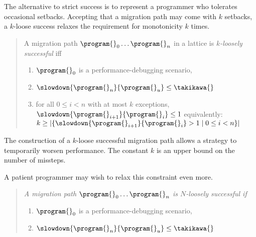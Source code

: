 The alternative to strict success is to represent a programmer who tolerates
occasional setbacks. Accepting that a migration path may come with $k$ setbacks,
a $k$-loose success relaxes the requirement for monotonicity $k$ times.

\begin{quote} \em

A migration path ${\program{}_0} \ldots {\program{}_n}$ in a
lattice  is \emph{$k$-loosely successful}
iff 
\begin{enumerate}
  \item  $\program{}_0$ is a performance-debugging scenario,
  \item $\slowdown{\program{}_n}{\program{}_u} \leq \takikawa{}$  
  \item
      for all $0 \leq i < n$ with at most $k$ exceptions,
      $\slowdown{\program{}_{i+1}}{\program{}_{i}} \leq 1$
      \subitem equivalently: $k \geq |\{ \slowdown{\program{}_{i+1}}{\program{}_{i}} > 1 \mid 0 \leq i < n\}|$
  \end{enumerate} 
\end{quote}
The construction of a $k$-loose successful migration path allows a strategy to
temporarily worsen performance. The constant $k$ is an
upper bound on the number of missteps.

A patient programmer may wish to relax this constraint even more.

\begin{quote} \em
A migration path ${\program{}_0} \ldots {\program{}_n}$ is $N$-loosely successful if 
  \begin{enumerate}
  \item  $\program{}_0$ is a performance-debugging scenario,
  \item $\slowdown{\program{}_n}{\program{}_u} \leq \takikawa{}$  
  \end{enumerate}
\end{quote}

